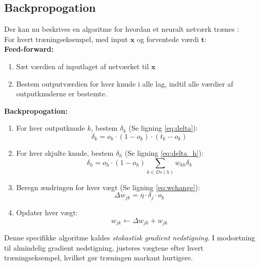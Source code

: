 \documentclass[../SOP.tex]{subfile}
\begin{document}
\subsection{Backpropogation}
\begin{minipage}{\textwidth}
  Der kan nu beskrives en algoritme for hvordan et neuralt netværk trænes \parencite{mitch}:\\
  For hvert træningseksempel, med input $\mathbf{x}$ og forventede værdi $\mathbf{t}$:\\
  \textbf{Feed-forward:}
  \begin{enumerate}
    \item Sæt værdien af inputlaget af netværket til $\mathbf{x}$
    \item Bestem outputværdien for hver knude i alle lag, indtil alle værdier af outputknuderne er bestemte.
  \end{enumerate}
  \textbf{Backpropogation:}
  \begin{enumerate}[resume]
    \item For hver outputknude $k$, bestem $\delta_k$ (Se ligning \ref{eq:delta}):
      \begin{equation*}
        \delta_k = o_k\cdot (1-o_k)\cdot(t_k-o_k)
      \end{equation*}
    \item For hver skjulte knude, bestem $\delta_h$ (Se ligning \ref{eq:delta_h}):
      \begin{equation*}
        \delta_h = o_h\cdot(1-o_h) \sum_{k\in Ds(h)} w_{kh}\delta_k
      \end{equation*}
    \item Beregn ændringen for hver vægt (Se ligning \ref{eq:wchange}):
      \begin{equation*}
        \Delta w_{jk} = \eta\cdot\delta_j\cdot o_k
      \end{equation*}
    \item Opdater hver vægt:
      \begin{equation*}
        w_{jk} \leftarrow \Delta w_{jk} + w_{jk}
      \end{equation*}
  \end{enumerate}
\end{minipage}
Denne specifikke algoritme kaldes \emph{stokastisk gradient nedstigning}. I modsætning til almindelig gradient nedstigning, justeres vægtene efter hvert træningseksempel, hvilket gør træningen markant hurtigere.
\end{document}
